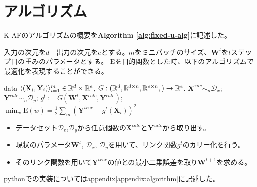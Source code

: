 \section{アルゴリズム}
\label{al}
K-AFのアルゴリズムの概要を{\bf Algorithm \ref{alg:fixed-u-alg}}に記述した。

入力の次元を$ d $　出力の次元を$ e $とする。$ m $をミニバッチのサイズ、$ \mathbf{W}^t $を$t$ステップ目の重みのパラメータとする。
$ \mathrm{E} $を目的関数とした時、以下のアルゴリズムで最適化を表現することができる。



\begin{algorithm}[]
	\caption{\KAF}
	\label{alg:fixed-u-alg}
\begin{algorithmic}
	 data $\langle (\mathbf{X}_i, \mathbf{Y}_i) \rangle_{i=1}^m \in
	\mathbb{R}^d \times \mathbb{R}^e$, $G: ( \mathbb{R}^d, \mathbb{R}^{d \times n}, \mathbb{R}^{e \times n}, ) \rightarrow  \mathbb{R}^e$.
	\STATE $\mathbf{X}^{calc} \sim_n \mathcal{D}_x$;
    \STATE $\mathbf{Y}^{calc} \sim_n \mathcal{D}_y$;
	\STATE $g^t := \tilde{G}(\mathbf{W}^t, \mathbf{X}^{calc}, \mathbf{Y}^{calc} )$;
	\STATE $ \displaystyle{\min_{w} \mathrm{E}(w)} = \frac{1}{2}\sum_m (\mathbf{Y}^{true} - g^t(\mathbf{X}_i))^2 $
	\ENDFOR
\end{algorithmic}
\end{algorithm}

\begin{itemize}
  \item データセット$\mathcal{D}_x$,$\mathcal{D}_y$から任意個数の$ \mathbf{X}^{calc} $と$ \mathbf{Y}^{calc} $から取り出す。
  \item 現状のパラメータ$ \mathbf{W}^t $, $\mathcal{D}_x$, $\mathcal{D}_y$を用いて、リンク関数$ g^t $のカリー化を行う。
  \item そのリンク関数を用いて$ \mathbf{Y}^{true} $の値との最小二乗誤差を取り$ \mathbf{W}^{t+1} $を求める。
\end{itemize}


pythonでの実装についてはappendix\ref{appendix:algorithm}に記述した。






